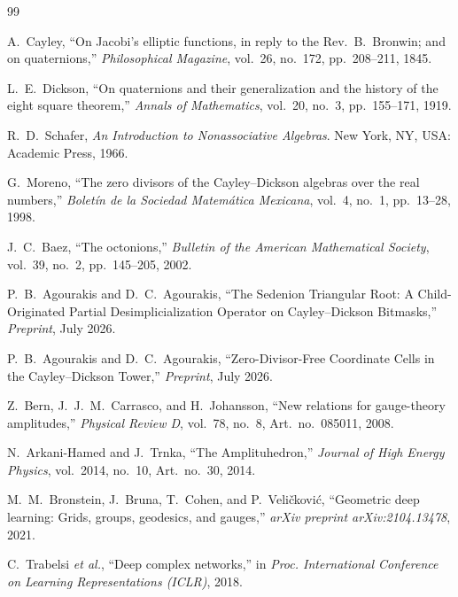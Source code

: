 \documentclass[11pt,a4paper]{article}
\theoremstyle{definition}
\theoremstyle{remark}
\begin{document}
\begin{thebibliography}{99}

A.~Cayley, ``On Jacobi's elliptic functions, in reply to the Rev.~B.~Bronwin; and on quaternions,'' \emph{Philosophical Magazine}, vol.~26, no.~172, pp.~208--211, 1845.

L.~E.~Dickson, ``On quaternions and their generalization and the history of the eight square theorem,'' \emph{Annals of Mathematics}, vol.~20, no.~3, pp.~155--171, 1919.

R.~D.~Schafer, \emph{An Introduction to Nonassociative Algebras}. New York, NY, USA: Academic Press, 1966.

G.~Moreno, ``The zero divisors of the Cayley--Dickson algebras over the real numbers,'' \emph{Bolet\'in de la Sociedad Matem\'atica Mexicana}, vol.~4, no.~1, pp.~13--28, 1998.

J.~C.~Baez, ``The octonions,'' \emph{Bulletin of the American Mathematical Society}, vol.~39, no.~2, pp.~145--205, 2002.

P.~B.~Agourakis and D.~C.~Agourakis, ``The Sedenion Triangular Root: A Child-Originated Partial Desimplicialization Operator on Cayley--Dickson Bitmasks,'' \emph{Preprint}, July 2026.

P.~B.~Agourakis and D.~C.~Agourakis, ``Zero-Divisor-Free Coordinate Cells in the Cayley--Dickson Tower,'' \emph{Preprint}, July 2026.

Z.~Bern, J.~J.~M.~Carrasco, and H.~Johansson, ``New relations for gauge-theory amplitudes,'' \emph{Physical Review D}, vol.~78, no.~8, Art.~no.~085011, 2008.

N.~Arkani-Hamed and J.~Trnka, ``The Amplituhedron,'' \emph{Journal of High Energy Physics}, vol.~2014, no.~10, Art.~no.~30, 2014.

M.~M.~Bronstein, J.~Bruna, T.~Cohen, and P.~Veli\v{c}kovi\'c, ``Geometric deep learning: Grids, groups, geodesics, and gauges,'' \emph{arXiv preprint arXiv:2104.13478}, 2021.

C.~Trabelsi \emph{et al.}, ``Deep complex networks,'' in \emph{Proc. International Conference on Learning Representations (ICLR)}, 2018.


\end{thebibliography}
\end{document}
